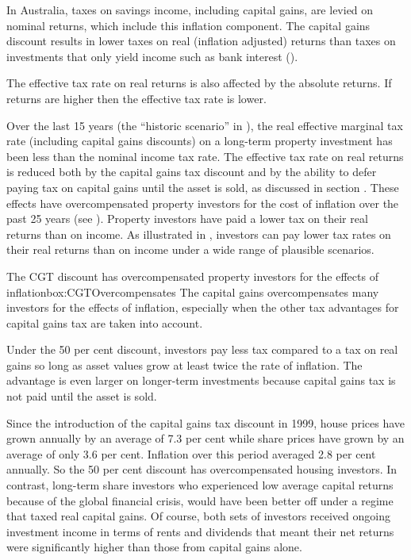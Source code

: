 \documentclass{grattan}\usepackage[]{graphicx}\usepackage[]{color}
\begin{document}
In Australia, taxes on savings income, including capital gains, are levied on nominal returns, which include this inflation component. The capital gains discount results in lower taxes on real (inflation adjusted) returns than taxes on investments that only yield income such as bank interest (). 

The effective tax rate on real returns is also affected by the absolute returns. If returns are higher then the effective tax rate is lower. 

Over the last 15 years (the ``historic scenario'' in ), the real effective marginal tax rate (including capital gains discounts) on a long-term property investment has been less than the nominal income tax rate. The effective tax rate on real returns is reduced both by the capital gains tax discount and by the ability to defer paying tax on capital gains until the asset is sold, as discussed in section . These effects have overcompensated property investors for the cost of inflation over the past 25 years (see ). Property investors have paid a lower tax on their real returns than on income. As illustrated in , investors can pay lower tax rates on their real returns than on income under a wide range of plausible scenarios. 

\begin{smallbox}{The CGT discount has overcompensated property investors for the effects of inflation}{box:CGTOvercompensates}
The capital gains overcompensates many investors for the effects of inflation, especially when the other tax advantages for capital gains tax are taken into account.  

Under the 50 per cent discount, investors pay less tax compared to a tax on real gains so long as asset values grow at least twice the rate of inflation. The advantage is even larger on longer-term investments because capital gains tax is not paid until the asset is sold.

Since the introduction of the capital gains tax discount in 1999, house prices have grown annually by an average of 7.3 per cent  while share prices have grown by an average of only 3.6 per cent.  Inflation over this period averaged 2.8 per cent annually.  So the 50 per cent discount has overcompensated housing investors. In contrast, long-term share investors who experienced low average capital returns because of the global financial crisis, would have been better off under a regime that taxed real capital gains. Of course, both sets of investors received ongoing investment income in terms of rents and dividends that meant their net returns were significantly higher than those from capital gains alone.   
\end{smallbox}
\end{document}
